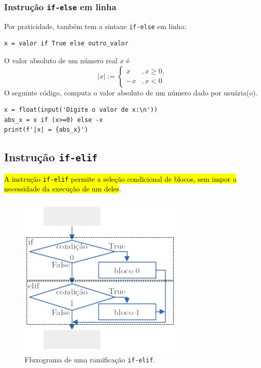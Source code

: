 \subsubsection{Instrução \lstinline+if-else+ em linha}

Por praticidade, {\python} também tem a sintaxe \lstinline+if-else+ em linha:

\begin{lstlisting}
x = valor if True else outro_valor
\end{lstlisting}

\begin{ex}
  O valor absoluto de um número real $x$ é
  \begin{equation}
    |x| := \left\{
      \begin{array}{ll}
        x &, x\geq 0,\\
        -x &, x<0
      \end{array}
    \right.
  \end{equation}
  O seguinte código, computa o valor absoluto de um número dado por usuária(o).
  
\begin{lstlisting}
x = float(input('Digite o valor de x:\n'))
abs_x = x if (x>=0) else -x
print(f'|x| = {abs_x}')
\end{lstlisting}

\end{ex}

\subsection{Instrução \texttt{if-elif}}

\hl{A instrução \texttt{if-elif} permite a seleção condicional de blocos, sem impor a necessidade da execução de um deles}.

\begin{figure}[H]
  \centering
  \includegraphics[width=0.7\textwidth]{./cap_progest/dados/fig_fg_elif/fig}
  \caption{Fluxograma de uma ramificação \lstinline+if-elif+.}
  \label{cap_progest_sec_ramifica:fig:fg_elif}
\end{figure}

